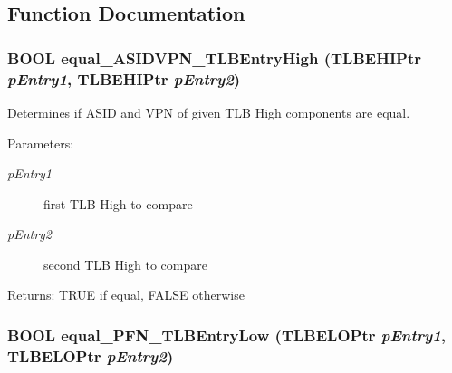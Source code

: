 \subsection{Function Documentation}
\hypertarget{group___v_m_m___p_t_e_g9903712483c2afdfad28dcca0768115f}{
\subsubsection[{equal\_\-ASIDVPN\_\-TLBEntryHigh}]{\setlength{\rightskip}{0pt plus 5cm}BOOL equal\_\-ASIDVPN\_\-TLBEntryHigh ({\bf TLBEHIPtr} {\em pEntry1}, \/  {\bf TLBEHIPtr} {\em pEntry2})}}
\label{group___v_m_m___p_t_e_g9903712483c2afdfad28dcca0768115f}


Determines if ASID and VPN of given TLB High components are equal. \begin{Desc}
\item[Parameters:]
\begin{description}
\item[{\em pEntry1}]first TLB High to compare \item[{\em pEntry2}]second TLB High to compare \end{description}
\end{Desc}
\begin{Desc}
\item[Returns:]TRUE if equal, FALSE otherwise \end{Desc}
\hypertarget{group___v_m_m___p_t_e_g58ccb6826bcf8c712b7c69d18b928f7e}{
\subsubsection[{equal\_\-PFN\_\-TLBEntryLow}]{\setlength{\rightskip}{0pt plus 5cm}BOOL equal\_\-PFN\_\-TLBEntryLow ({\bf TLBELOPtr} {\em pEntry1}, \/  {\bf TLBELOPtr} {\em pEntry2})}}
\label{group___v_m_m___p_t_e_g58ccb6826bcf8c712b7c69d18b928f7e}


